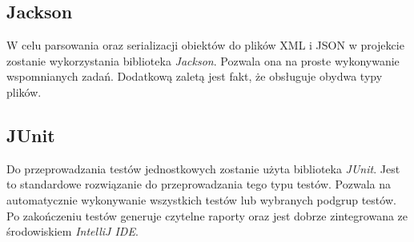\documentclass{report}
\begin{document}
\subsection{Jackson}
W celu parsowania oraz serializacji obiektów do plików XML i JSON w projekcie zostanie wykorzystania biblioteka \textit{Jackson}. Pozwala ona na proste wykonywanie wspomnianych zadań. Dodatkową zaletą jest fakt, że obsługuje obydwa typy plików.

\subsection{JUnit}
Do przeprowadzania testów jednostkowych zostanie użyta biblioteka \textit{JUnit}. Jest to standardowe rozwiązanie do przeprowadzania tego typu testów.
Pozwala na automatycznie wykonywanie wszystkich testów lub wybranych podgrup testów. Po zakończeniu testów generuje czytelne raporty oraz jest dobrze zintegrowana ze środowiskiem \textit{IntelliJ IDE}.
\end{document}
